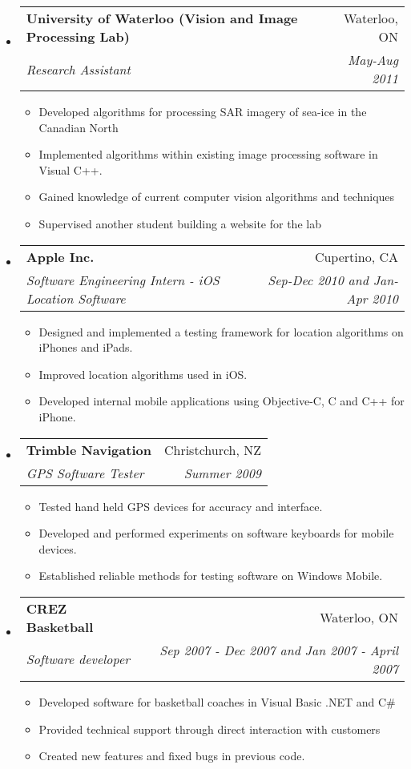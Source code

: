 \documentclass[letterpaper,11pt]{article}
\makeatletter
\newcommand{\resitem}[1]{\item #1 \vspace{-2pt}}
\newcommand{\ressubheading}[4]{

\begin{tabular*}{6.5in}{l@{\cftdotfill{\cftsecdotsep}\extracolsep{\fill}}r}

		\textbf{#1} & #2 \\

		\textit{#3} & \textit{#4} \\

\end{tabular*}\vspace{-6pt}}
\makeatother
\begin{document}
\begin{itemize}

\item

	\ressubheading{University of Waterloo  (Vision and Image Processing Lab)}{Waterloo, ON}{Research Assistant}{May-Aug 2011}

	\begin{itemize}
	
		\resitem{Developed algorithms for processing SAR imagery of sea-ice in the Canadian North}
		\resitem{Implemented algorithms within existing image processing software in Visual C++.}
		\resitem{Gained knowledge of current computer vision algorithms and techniques}
    	\resitem{Supervised another student building a website for the lab}
	
	\end{itemize}

\item

	\ressubheading{Apple Inc.}{Cupertino, CA}{Software Engineering Intern - iOS Location Software}{Sep-Dec 2010 and Jan-Apr 2010}

	\begin{itemize}

	    \resitem{Designed and implemented a testing framework for location algorithms on iPhones and iPads.}
		\resitem{Improved location algorithms used in iOS.}
		\resitem{Developed internal mobile applications using Objective-C, C and C++ for iPhone.}

	\end{itemize}

\item 

	\ressubheading{Trimble Navigation}{Christchurch, NZ}{GPS Software Tester}{Summer 2009}

	\begin{itemize}

		\resitem{Tested hand held GPS devices for accuracy and interface.}
		\resitem{Developed and performed experiments on software keyboards for mobile devices.}
		\resitem{Established reliable methods for testing software on Windows Mobile.}

	\end{itemize}

\item

	\ressubheading{CREZ Basketball}{Waterloo, ON}{Software developer}{Sep 2007 - Dec 2007 and Jan 2007 - April 2007}

	\begin{itemize}

		\resitem{Developed software for basketball coaches in Visual Basic .NET and C\#}
		\resitem{Provided technical support through direct interaction with customers}
		\resitem{Created new features and fixed bugs in previous code.}

	\end{itemize}

\end{itemize}
\end{document}
